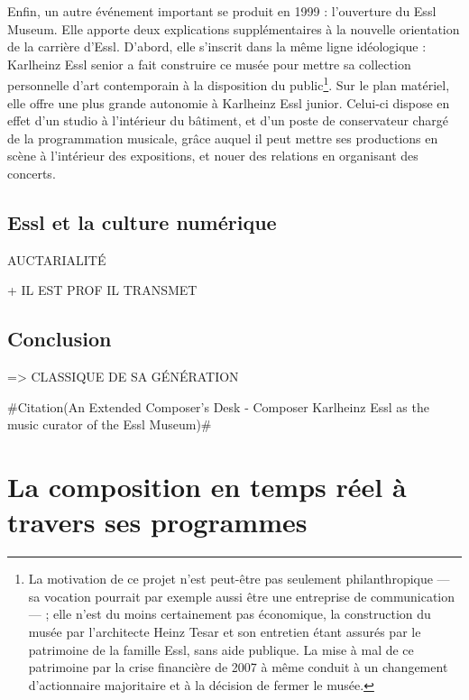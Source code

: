 \documentclass[a4paper,12pt]{article}
\newcommand{\zitat}[2]{\#Citation(#2)\#}
\begin{document}
Enfin, un autre événement important se produit en 1999 : l'ouverture du Essl Museum. Elle apporte deux explications supplémentaires à la nouvelle orientation de la carrière d'Essl. D'abord, elle s'inscrit dans la même ligne idéologique : Karlheinz Essl senior a fait construire ce musée pour mettre sa collection personnelle d'art contemporain à la disposition du public\footnote{La motivation de ce projet n'est peut-être pas seulement philanthropique --- sa vocation pourrait par exemple aussi être une entreprise de communication --- ; elle n'est du moins certainement pas économique, la construction du musée par l'architecte Heinz Tesar et son entretien étant assurés par le patrimoine de la famille Essl, sans aide publique. La mise à mal de ce patrimoine par la crise financière de 2007 à même conduit à un changement d'actionnaire majoritaire et à la décision de fermer le musée.}. Sur le plan matériel, elle offre une plus grande autonomie à Karlheinz Essl junior. Celui-ci dispose en effet d'un studio à l'intérieur du bâtiment, et d'un poste de conservateur chargé de la programmation musicale, grâce auquel il peut mettre ses productions en scène à l'intérieur des expositions, et nouer des relations en organisant des concerts.

\subsection{Essl et la culture numérique}

AUCTARIALITÉ

+ IL EST PROF IL TRANSMET

\subsection{Conclusion}

=> CLASSIQUE DE SA GÉNÉRATION

\zitat{... with complete autonomy since without public funding
... the famous names of 20th-century music with a clear inclination towards the composers that happily pursued the spirit of modernism even through the post-modern era. Hardly a coincidence, since kHz considers himself as belonging to that ilk.}
{An Extended Composer’s Desk - Composer Karlheinz Essl as the music curator of the Essl Museum}



\section{La composition en temps réel à travers ses programmes}
\end{document}
